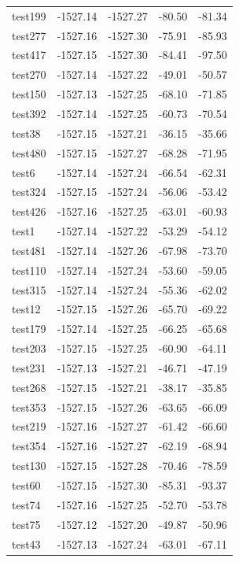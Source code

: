 \documentclass[journal=jacsat,manuscript=article]{achemso}
\begin{document}
\begin{table}[b!]
\begin{tabular}{lrrrr}
test199 &  -1527.14 &  -1527.27 &  -80.50 &  -81.34 \\
test277 &  -1527.16 &  -1527.30 &  -75.91 &  -85.93 \\
test417 &  -1527.15 &  -1527.30 &  -84.41 &  -97.50 \\
test270 &  -1527.14 &  -1527.22 &  -49.01 &  -50.57 \\
test150 &  -1527.13 &  -1527.25 &  -68.10 &  -71.85 \\
test392 &  -1527.14 &  -1527.25 &  -60.73 &  -70.54 \\
test38  &  -1527.15 &  -1527.21 &  -36.15 &  -35.66 \\
test480 &  -1527.15 &  -1527.27 &  -68.28 &  -71.95 \\
test6   &  -1527.14 &  -1527.24 &  -66.54 &  -62.31 \\
test324 &  -1527.15 &  -1527.24 &  -56.06 &  -53.42 \\
test426 &  -1527.16 &  -1527.25 &  -63.01 &  -60.93 \\
test1   &  -1527.14 &  -1527.22 &  -53.29 &  -54.12 \\
test481 &  -1527.14 &  -1527.26 &  -67.98 &  -73.70 \\
test110 &  -1527.14 &  -1527.24 &  -53.60 &  -59.05 \\
test315 &  -1527.14 &  -1527.24 &  -55.36 &  -62.02 \\
test12  &  -1527.15 &  -1527.26 &  -65.70 &  -69.22 \\
test179 &  -1527.14 &  -1527.25 &  -66.25 &  -65.68 \\
test203 &  -1527.15 &  -1527.25 &  -60.90 &  -64.11 \\
test231 &  -1527.13 &  -1527.21 &  -46.71 &  -47.19 \\
test268 &  -1527.15 &  -1527.21 &  -38.17 &  -35.85 \\
test353 &  -1527.15 &  -1527.26 &  -63.65 &  -66.09 \\
test219 &  -1527.16 &  -1527.27 &  -61.42 &  -66.60 \\
test354 &  -1527.16 &  -1527.27 &  -62.19 &  -68.94 \\
test130 &  -1527.15 &  -1527.28 &  -70.46 &  -78.59 \\
test60  &  -1527.15 &  -1527.30 &  -85.31 &  -93.37 \\
test74  &  -1527.16 &  -1527.25 &  -52.70 &  -53.78 \\
test75  &  -1527.12 &  -1527.20 &  -49.87 &  -50.96 \\
test43  &  -1527.13 &  -1527.24 &  -63.01 &  -67.11 \\

\end{tabular}
\end{table}
\end{document}
